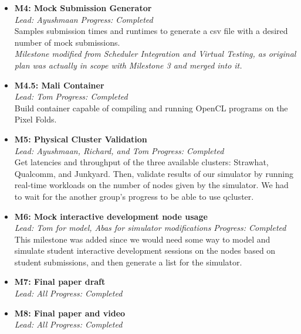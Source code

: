 \documentclass[acmlarge]{acmart}
\begin{document}
\begin{itemize}
\item \textbf{M4: Mock Submission Generator} \\
\textit{Lead: Ayushmaan} \hfill
\textit{Progress: Completed} \\
Samples submission times and runtimes to generate a csv file with a desired number of mock submissions.\\
\emph{Milestone modified from Scheduler Integration and Virtual Testing, as original plan was actually in scope with Milestone 3 and merged into it.} \\

\item \textbf{M4.5: Mali Container} \\
\textit{Lead: Tom} \hfill
\textit{Progress: Completed} \\
Build container capable of compiling and running OpenCL programs on the Pixel Folds. \\

\item \textbf{M5: Physical Cluster Validation} \\
\textit{Lead: Ayushmaan, Richard, and Tom} \hfill
\textit{Progress: Completed} \\
Get latencies and throughput of the three available clusters: Strawhat, Qualcomm, and Junkyard. Then, validate results of our simulator by running real-time workloads on the number of nodes given by the simulator. We had to wait for the another group's progress to be able to use qcluster.\\

\item \textbf{M6: Mock interactive development node usage} \\
\textit{Lead: Tom for model, Abas for simulator modifications} \hfill
\textit{Progress: Completed} \\
This milestone was added since we would need some way to model and simulate student interactive development sessions on the nodes based on student submissions, and then generate a list for the simulator.

\item \textbf{M7: Final paper draft} \\
\textit{Lead: All} \hfill
\textit{Progress: Completed}

\item \textbf{M8: Final paper and video} \\
\textit{Lead: All} \hfill
\textit{Progress: Completed}

\end{itemize}
\end{document}
